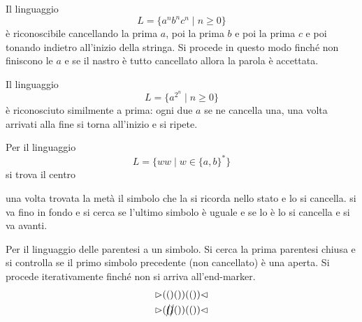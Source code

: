 \documentclass[12pt]{report}
\theoremstyle{definition}
\begin{document}
\begin{tcolorbox}[breakable]
	Il linguaggio
	$$ L = \{ a^n b^n c^n \mid n \geq 0 \} $$
	è riconoscibile cancellando la prima $a$, poi la prima $b$ e poi la prima $c$ e poi tonando indietro all'inizio della stringa.
	Si procede in questo modo finché non finiscono le $a$ e se il nastro è tutto cancellato allora la parola è accettata.
\end{tcolorbox}
\begin{tcolorbox}[breakable]
	Il linguaggio
	$$ L = \{ a^{2^n} \mid n \geq 0 \} $$
	è riconosciuto similmente a prima: ogni due $a$ se ne cancella una, una volta arrivati alla fine si torna all'inizio e si ripete.
\end{tcolorbox}
\begin{tcolorbox}[breakable]
	Per il linguaggio
	$$ L = \{ w w \mid w \in \{a, b\}^* \} $$
	si trova il centro
	\begin{center}
	\end{center}
	una volta trovata la metà il simbolo che la si ricorda nello stato e lo si cancella.
	si va fino in fondo e si cerca se l'ultimo simbolo è uguale e se lo è lo si cancella e si va avanti.
\end{tcolorbox}

\begin{tcolorbox}[breakable]
	Per il linguaggio delle parentesi a un simbolo.
	Si cerca la prima parentesi chiusa e si controlla se il primo simbolo precedente (non cancellato) è una aperta.
	Si procede iterativamente finché non si arriva all'end-marker.
	\begin{align*}
		\rhd ( ( ) ( ) ) (()) \lhd \\
		\rhd ( \cancel{(} \cancel{)} ( ) ) (()) \lhd \\ %
	\end{align*}
\end{tcolorbox}
\end{document}
